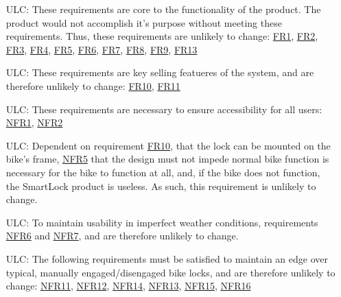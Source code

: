 \documentclass[12pt]{article}
\newcounter{lcnum} %
\newcounter{ulcnum} %
\begin{document}
\noindent \begin{itemize}


\item[ULC\refstepcounter{ulcnum}\theulcnum\label{LC_meaningfulLabel}:] These requirements are core to the functionality of the product. The product would not accomplish it's purpose without meeting these requirements. Thus, these requirements are  unlikely to change: \hyperref[FR1]{FR1}, \hyperref[FR2]{FR2}, \hyperref[FR3]{FR3}, \hyperref[FR4]{FR4}, \hyperref[FR5]{FR5}, \hyperref[FR6]{FR6}, \hyperref[FR7]{FR7}, \hyperref[FR8]{FR8}, \hyperref[FR9]{FR9}, \hyperref[FR13]{FR13}
\item[ULC\refstepcounter{ulcnum}\theulcnum\label{LC_meaningfulLabel}:] These requirements are key selling featueres of the system, and are therefore unlikely to change: \hyperref[FR10]{FR10}, \hyperref[FR11]{FR11}
\item[ULC\refstepcounter{ulcnum}\theulcnum\label{LC_meaningfulLabel}:] These requirements are necessary to ensure accessibility for all users: \hyperref[NFR1]{NFR1}, \hyperref[NFR2]{NFR2}
\item[ULC\refstepcounter{ulcnum}\theulcnum\label{LC_meaningfulLabel}:] Dependent on requirement \hyperref[FR10]{ FR10}, that the lock can be mounted on the bike's frame, \hyperref[NFR5]{NFR5} that the design must not impede normal bike function is necessary for the bike to function at all, and, if the bike does not function, the SmartLock product is useless. As such, this requirement is unlikely to change.
\item[ULC\refstepcounter{ulcnum}\theulcnum\label{LC_meaningfulLabel}:] To maintain usability in imperfect weather conditions, requirements \hyperref[NFR6]{NFR6} and \hyperref[NFR7]{NFR7}, and are therefore unlikely to change. \item[ULC\refstepcounter{ulcnum}\theulcnum\label{LC_meaningfulLabel}:] The following requirements must be satisfied to maintain an edge over typical, manually engaged/disengaged bike locks, and are therefore unlikely to change: \hyperref[NFR11]{NFR11}, \hyperref[NFR12]{NFR12}, \hyperref[NFR14]{NFR14}, \hyperref[NFR13]{NFR13}, \hyperref[NFR15]{NFR15}, \hyperref[NFR16]{NFR16}

\end{itemize}
\end{document}
